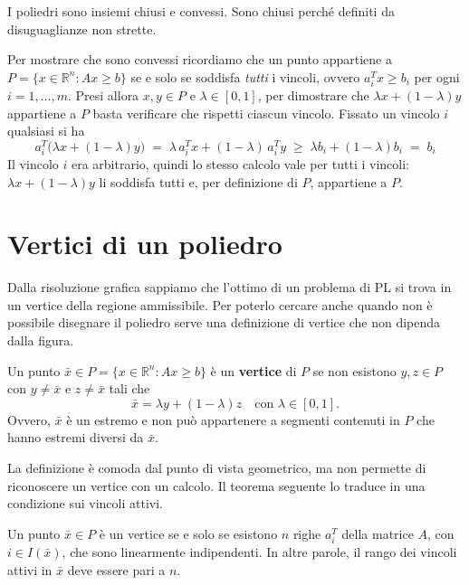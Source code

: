 \begin{osservazione}\label{oss:convesso}
I poliedri sono insiemi chiusi e convessi. Sono chiusi perché definiti da disuguaglianze non strette.

Per mostrare che sono convessi ricordiamo che un punto appartiene a $P = \{x \in \mathbb{R}^n : A x \ge b\}$ se e solo se soddisfa \emph{tutti} i vincoli, ovvero $a_i^T x \ge b_i$ per ogni $i = 1, \dots, m$. Presi allora $x, y \in P$ e $\lambda \in [0, 1]$, per dimostrare che $\lambda x + (1 - \lambda) y$ appartiene a $P$ basta verificare che rispetti ciascun vincolo. Fissato un vincolo $i$ qualsiasi si ha
\[
a_i^T \big(\lambda x + (1 - \lambda) y\big) \;=\; \lambda\, a_i^T x + (1 - \lambda)\, a_i^T y \;\ge\; \lambda b_i + (1 - \lambda) b_i \;=\; b_i
\]
 Il vincolo $i$ era arbitrario, quindi lo stesso calcolo vale per tutti i vincoli: $\lambda x + (1 - \lambda) y$ li soddisfa tutti e, per definizione di $P$, appartiene a $P$.
\end{osservazione}

\section{Vertici di un poliedro}
Dalla risoluzione grafica sappiamo che l'ottimo di un problema di PL si trova in un vertice della regione ammissibile. Per poterlo cercare anche quando non è possibile disegnare il poliedro serve una definizione di vertice che non dipenda dalla figura.

\begin{definizione}[Vertice]\label{def:vertice}
Un punto $\bar{x} \in P = \{x \in \mathbb{R}^n : A x \ge b\}$ è un \textbf{vertice} di $P$ se non esistono $y, z \in P$ con $y \neq \bar{x}$ e $z \neq \bar{x}$ tali che
\[
\bar{x} = \lambda y + (1 - \lambda) z \quad \text{con } \lambda \in [0, 1].
\]
Ovvero, $\bar{x}$ è un estremo e non può appartenere a segmenti contenuti in $P$ che hanno estremi diversi da $\bar{x}$.
\end{definizione}

La definizione è comoda dal punto di vista geometrico, ma non permette di riconoscere un vertice con un calcolo. Il teorema seguente lo traduce in una condizione sui vincoli attivi.

\begin{teorema}\label{teo:vertici}
Un punto $\bar{x} \in P$ è un vertice se e solo se esistono $n$ righe $a_i^T$ della matrice $A$, con $i \in I(\bar{x})$, che sono linearmente indipendenti. In altre parole, il rango dei vincoli attivi in $\bar{x}$ deve essere pari a $n$.
\end{teorema}

